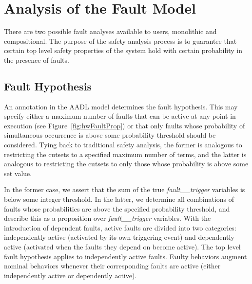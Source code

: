 \section{Analysis of the Fault Model}
\label{sec:fault_analysis}
There are two possible fault analyses available to users, monolithic and compositional. 
The purpose of the safety analysis process is to guarantee that certain top level safety properties of the system hold with certain probability in the presence of faults. 


\subsection{Fault Hypothesis}

An annotation in the AADL model determines the fault hypothesis. This may specify either a maximum number of faults that can be active at any point in execution (see Figure~\ref{fig:hwFaultProp}) or that only faults whose probability of simultaneous occurrence is above some probability threshold should be considered. Tying back to traditional safety analysis, the former is analogous to restricting the cutsets to a specified maximum number of terms, and the latter is analogous to restricting the cutsets to only those whose probability is above some set value.

In the former case, we assert that the sum of the true {\em fault\_\_trigger} variables is below some integer threshold.  In the latter, we determine all combinations of faults whose probabilities are above the specified probability threshold, and describe this as a proposition over {\em fault\_\_trigger} variables. 
%
With the introduction of dependent faults, active faults are divided into two categories: independently active (activated by its own triggering event) and dependently active (activated when the faults they depend on become active). The top level fault hypothesis applies to independently active faults. Faulty behaviors augment nominal behaviors whenever their corresponding faults are active (either independently active or dependently active).

